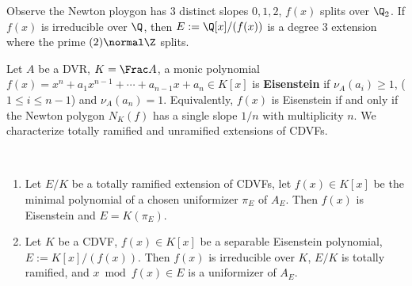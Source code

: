 \documentclass[11pt]{amsart}
\begin{document}
Observe the Newton ploygon has $3$ distinct slopes $0, 1, 2$, $f(x)$ splits
over $\Q_2$.  If $f(x)$ is irreducible over $\Q$, then $E :=
\Q[x]/(f(x))$ is a degree $3$ extension where the prime $(2) \normal \Z$
splits.

\medbreak

Let $A$ be a DVR, $K = \Frac A$, a monic polynomial $f(x) = x^n + a_1x^{n-1} +
\cdots + a_{n-1}x + a_n \in K[x]$ is {\bf Eisenstein}  if $\nu_A(a_i) \geq 1$, ($1 \leq i \leq n-1$) and $\nu_A(a_n) =
1$.  Equivalently, $f(x)$ is Eisenstein if and only if the Newton polygon
$N_K(f)$ has a single slope $1/n$ with multiplicity $n$.  We characterize
totally ramified and unramified extensions of CDVFs.

\begin{prop}~
    \label{prop:totally-ramified-cdvf}
    \begin{enumerate}
        \item Let $E/K$ be a totally ramified extension of CDVFs, let $f(x) \in
            K[x]$ be the minimal polynomial of a chosen uniformizer $\pi_E$ of
            $A_E$.  Then $f(x)$ is Eisenstein and $E = K(\pi_E)$.

        \item Let $K$ be a CDVF, $f(x) \in K[x]$ be a separable Eisenstein
            polynomial, $E := K[x]/(f(x))$.  Then $f(x)$ is irreducible over
            $K$, $E/K$ is totally ramified, and $x \bmod{f(x)} \in E$ is a
            uniformizer of $A_E$.
    \end{enumerate}
\end{prop}
\end{document}
